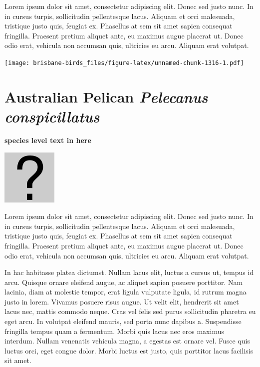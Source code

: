 \documentclass[]{book}
\let\origfigure\figure
\let\endorigfigure\endfigure
\renewenvironment{figure}[1][2] {
  \expandafter\origfigure\expandafter[H]
} {
  \endorigfigure
}
\begin{document}
Lorem ipsum dolor sit amet, consectetur adipiscing elit. Donec sed justo
nunc. In in cursus turpis, sollicitudin pellentesque lacus. Aliquam et
orci malesuada, tristique justo quis, feugiat ex. Phasellus at sem sit
amet sapien consequat fringilla. Praesent pretium aliquet ante, eu
maximus augue placerat ut. Donec odio erat, vehicula non accumsan quis,
ultricies eu arcu. Aliquam erat volutpat.

\texttt{[image: brisbane-birds\_files/figure-latex/unnamed-chunk-1316-1.pdf]}

\section{\texorpdfstring{Australian Pelican \emph{Pelecanus
conspicillatus}}{Australian Pelican Pelecanus conspicillatus}}\label{australian-pelican-pelecanus-conspicillatus}

\textbf{species level text in here}

\begin{figure}
\centering
\includegraphics{assets/missing.png}
\caption{No image for species}
\end{figure}

Lorem ipsum dolor sit amet, consectetur adipiscing elit. Donec sed justo
nunc. In in cursus turpis, sollicitudin pellentesque lacus. Aliquam et
orci malesuada, tristique justo quis, feugiat ex. Phasellus at sem sit
amet sapien consequat fringilla. Praesent pretium aliquet ante, eu
maximus augue placerat ut. Donec odio erat, vehicula non accumsan quis,
ultricies eu arcu. Aliquam erat volutpat.

In hac habitasse platea dictumst. Nullam lacus elit, luctus a cursus ut,
tempus id arcu. Quisque ornare eleifend augue, ac aliquet sapien posuere
porttitor. Nam lacinia, diam at molestie tempor, erat ligula vulputate
ligula, id rutrum magna justo in lorem. Vivamus posuere risus augue. Ut
velit elit, hendrerit sit amet lacus nec, mattis commodo neque. Cras vel
felis sed purus sollicitudin pharetra eu eget arcu. In volutpat eleifend
mauris, sed porta nunc dapibus a. Suspendisse fringilla tempus quam a
fermentum. Morbi quis lacus nec eros maximus interdum. Nullam venenatis
vehicula magna, a egestas est ornare vel. Fusce quis luctus orci, eget
congue dolor. Morbi luctus est justo, quis porttitor lacus facilisis sit
amet.
\end{document}
